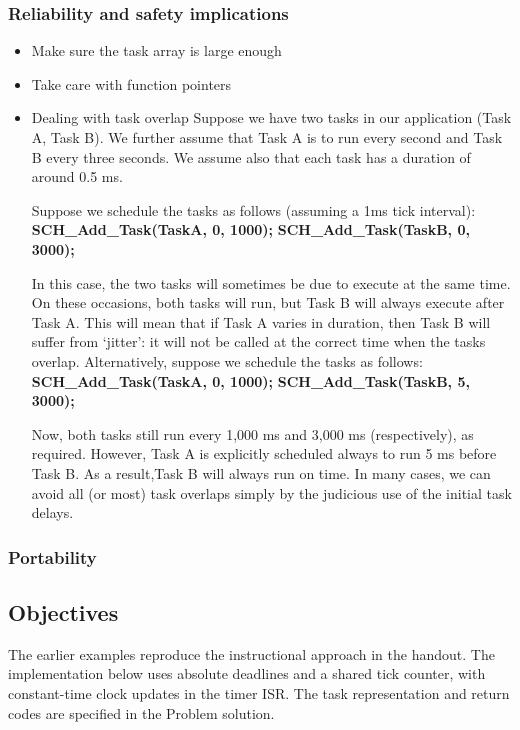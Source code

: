\subsubsection{Reliability and safety implications}
\begin{itemize}
    \item Make sure the task array is large enough
    \item Take care with function pointers
    \item Dealing with task overlap
    \subitem Suppose we have two tasks in our application (Task A, Task B). We further assume that Task A is to run every second and Task B every three seconds. We assume also that
each task has a duration of around 0.5 ms.  

    \subitem Suppose we schedule the tasks as follows (assuming a 1ms tick interval):
        \subsubitem \textbf{SCH\_Add\_Task(TaskA, 0, 1000);}
        \subsubitem \textbf{SCH\_Add\_Task(TaskB, 0, 3000);}

\subitem In this case, the two tasks will sometimes be due to execute at the same time. On
these occasions, both tasks will run, but Task B will always execute after Task A. This will mean that if Task A varies in duration, then Task B will suffer from ‘jitter’: it will not be called at the correct time when the tasks overlap.
\subitem Alternatively, suppose we schedule the tasks as follows:
\subsubitem \textbf{SCH\_Add\_Task(TaskA, 0, 1000);}
\subsubitem \textbf{SCH\_Add\_Task(TaskB, 5, 3000);}

\subitem Now, both tasks still run every 1,000 ms and 3,000 ms (respectively), as required. However, Task A is explicitly scheduled always to run 5 ms before Task B. As a result,Task B will always run on time.
\subitem In many cases, we can avoid all (or most) task overlaps simply by the judicious use
of the initial task delays.

\end{itemize}






\subsubsection{Portability}
\subsection{Objectives}
The earlier examples reproduce the instructional approach in the handout. The implementation below uses absolute deadlines and a shared tick counter, with constant-time clock updates in the timer ISR. The task representation and return codes are specified in the Problem solution.

